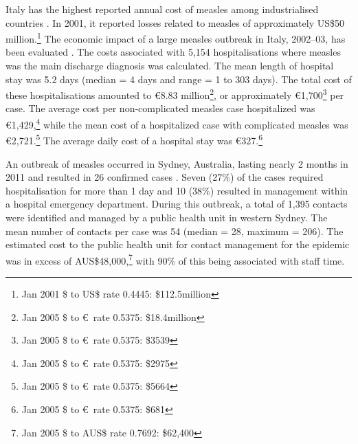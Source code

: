 \documentclass{article}
\begin{document}
Italy has the highest reported annual cost of measles among industrialised countries \citep{carabin3}. In 2001, it reported losses related to measles of approximately US\$50 million.\footnote{Jan 2001 \$ to US\$ rate 0.4445: \$112.5million} The economic impact of a large measles outbreak in Italy, 2002--03, has been evaluated \citep{filia7}. The costs associated with 5,154 hospitalisations where measles was the main discharge diagnosis was calculated. The mean length of hospital stay was 5.2 days (median = 4 days and range = 1 to 303 days). The total cost of these hospitalisations amounted to \euro 8.83 million\footnote{Jan 2005 \$ to \euro\ rate 0.5375: \$18.4million}, or approximately \euro 1,700\footnote{Jan 2005 \$ to \euro\ rate 0.5375: \$3539} per case. The average cost per non-complicated measles case hospitalized was  \euro 1,429,\footnote{Jan 2005 \$ to \euro\ rate 0.5375: \$2975} while the mean cost of a hospitalized case with complicated measles was  \euro 2,721.\footnote{Jan 2005 \$ to \euro\ rate 0.5375: \$5664} The average daily cost of a hospital stay was  \euro 327.\footnote{Jan 2005 \$ to \euro\ rate 0.5375: \$681}

An outbreak of measles occurred in Sydney, Australia, lasting nearly 2 months in 2011 and resulted in 26 confirmed cases \citep{flego13}. Seven (27\%) of the cases required hospitalisation for more than 1 day and 10 (38\%) resulted in management within a hospital emergency department. During this outbreak, a total of 1,395 contacts were identified and managed by a public health unit in western Sydney. The mean number of contacts per case was 54 (median = 28, maximum = 206). The estimated cost to the public health unit for contact management for the epidemic was in excess of AUS\$48,000,\footnote{Jan 2005 \$ to AUS\$ rate 0.7692: \$62,400} with 90\% of this being associated with staff time. 
\end{document}
